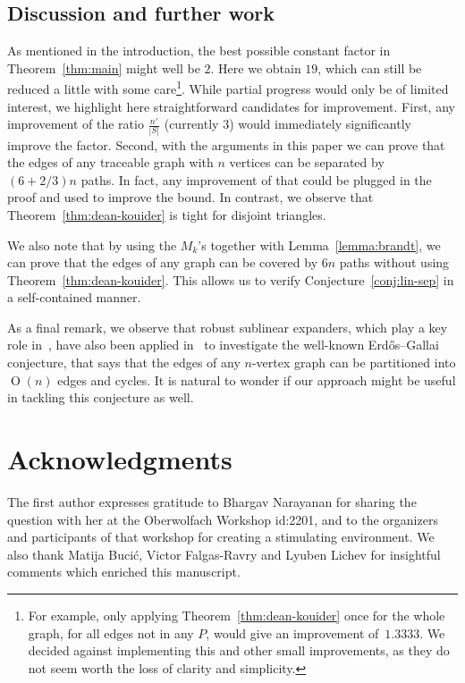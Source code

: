 \documentclass[11pt]{article}
\DeclareMathOperator{\bigoh}{\mathrm{O}}
\begin{document}
\subsection*{Discussion and further work}
As mentioned in the introduction, the best possible constant factor in Theorem~\ref{thm:main} might well be $2$. Here we obtain $19$, which can still be reduced a little with some care\footnote{For example, only applying Theorem~\ref{thm:dean-kouider} once for the whole graph, for all edges not in any $P$, would give an improvement of~$1.3333$. We decided against implementing this and other small improvements, as they do not seem worth the loss of clarity and simplicity.
}. While partial progress would only be of limited interest, we highlight here straightforward candidates for improvement. First, any improvement of the ratio $\frac{n'}{|S|}$ (currently $3$) would immediately significantly improve the factor. Second, with the arguments in this paper we can prove that the edges of any traceable graph with \(n\) vertices can be separated by \((6+2/3)n\) paths. In fact, any improvement of that could be plugged in the proof and used to improve the bound.
In contrast, we observe that Theorem~\ref{thm:dean-kouider} is tight for disjoint triangles.


We also note that by using the \(M_k\)'s together with Lemma~\ref{lemma:brandt}, we can prove that the edges of any graph can be covered by \(6n\) paths without using Theorem~\ref{thm:dean-kouider}. This allows us to verify Conjecture~\ref{conj:lin-sep}
in a self-contained manner.

  As a final remark, we observe that robust sublinear expanders,
which play a key role in~\cite{letzter2022separating}, have also
been applied in~\cite{bucic2022towards} to investigate the well-known Erd\H os--Gallai
conjecture, that says that the edges of any $n$-vertex graph can
be partitioned into $\bigoh(n) $ edges and
cycles. It is natural to wonder if our
approach might be useful in tackling this conjecture as well.


\section*{Acknowledgments}

The first author expresses gratitude to Bhargav Narayanan for sharing the question with her at the Oberwolfach Workshop id:2201, and to the organizers and participants of that workshop for creating a stimulating environment.
We also thank Matija Buci\'c, Victor Falgas-Ravry and Lyuben Lichev for insightful comments which enriched this manuscript.
\end{document}
